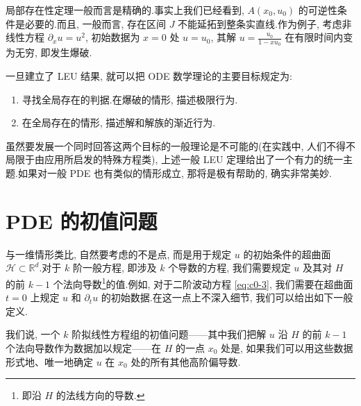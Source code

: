 \begin{remark*}
局部存在性定理一般而言是精确的.事实上我们已经看到, $A(x_{0}, u_{0})$ 的可逆性条件是必要的.而且, 一般而言, 存在区间 $J$ 不能延拓到整条实直线.作为例子, 考虑非线性方程 $\partial_{x} u = u^{2}$, 初始数据为 $x = 0$ 处 $u = u_{0}$, 其解 $u = \frac{u_{0}}{1 - x u_{0}}$ 在有限时间内变为无穷, 即发生爆破.
\end{remark*}

一旦建立了 LEU 结果, 就可以把 ODE 数学理论的主要目标规定为:
\begin{enumerate}
\item 寻找全局存在的判据.在爆破的情形, 描述极限行为.
\item 在全局存在的情形, 描述解和解族的渐近行为.
\end{enumerate}
虽然要发展一个同时回答这两个目标的一般理论是不可能的(在实践中, 人们不得不局限于由应用所启发的特殊方程类), 上述一般 LEU 定理给出了一个有力的统一主题.如果对一般 PDE 也有类似的情形成立, 那将是极有帮助的, 确实非常美妙.

\section{PDE 的初值问题}

与一维情形类比, 自然要考虑的不是点, 而是用于规定 $u$ 的初始条件的超曲面 $\mathcal{H} \subset \mathbb{R}^{d}$.对于 $k$ 阶一般方程, 即涉及 $k$ 个导数的方程, 我们需要规定 $u$ 及其对 $H$ 的前 $k - 1$ 个法向导数\footnote{即沿 $H$ 的法线方向的导数.}的值.例如, 对于二阶波动方程 \eqref{eq:c0-3}, 我们需要在超曲面 $t = 0$ 上规定 $u$ 和 $\partial_{t} u$ 的初始数据.在这一点上不深入细节, 我们可以给出如下一般定义.

\begin{definition*}
我们说, 一个 $k$ 阶拟线性方程组的初值问题——其中我们把解 $u$ 沿 $H$ 的前 $k - 1$ 个法向导数作为数据加以规定——在 $H$ 的一点 $x_{0}$ 处是, 如果我们可以用这些数据形式地、唯一地确定 $u$ 在 $x_{0}$ 处的所有其他高阶偏导数.
\end{definition*}

